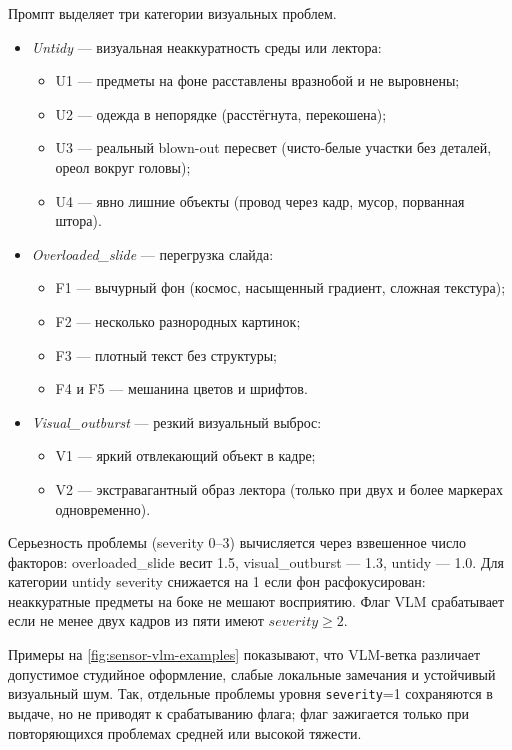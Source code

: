 Промпт выделяет три категории визуальных проблем.
\begin{itemize}
    \item \textit{Untidy} — визуальная неаккуратность среды или лектора:
    \begin{itemize}
        \item U1 — предметы на фоне расставлены вразнобой и не выровнены;
        \item U2 — одежда в непорядке (расстёгнута, перекошена);
        \item U3 — реальный blown-out пересвет (чисто-белые участки без деталей, ореол вокруг головы);
        \item U4 — явно лишние объекты (провод через кадр, мусор, порванная штора).
    \end{itemize}

    \item \textit{Overloaded\_slide} — перегрузка слайда:
    \begin{itemize}
        \item F1 — вычурный фон (космос, насыщенный градиент, сложная текстура);
        \item F2 — несколько разнородных картинок;
        \item F3 — плотный текст без структуры;
        \item F4 и F5 — мешанина цветов и шрифтов.
    \end{itemize}

    \item \textit{Visual\_outburst} — резкий визуальный выброс:
    \begin{itemize}
        \item V1 — яркий отвлекающий объект в кадре;
        \item V2 — экстравагантный образ лектора (только при двух и более маркерах одновременно).
    \end{itemize}
\end{itemize}

Серьезность проблемы (severity 0–3) вычисляется через взвешенное число факторов:
overloaded\_slide весит 1.5, visual\_outburst — 1.3, untidy — 1.0.
Для категории untidy severity снижается на 1 если фон расфокусирован:
неаккуратные предметы на боке не мешают восприятию.
Флаг VLM срабатывает если не менее двух кадров из пяти имеют $severity\geq 2$.

Примеры на \cref{fig:sensor-vlm-examples} показывают, что VLM-ветка различает допустимое студийное оформление,
слабые локальные замечания и устойчивый визуальный шум. Так, отдельные проблемы уровня \texttt{severity}=1 сохраняются в выдаче,
но не приводят к срабатыванию флага; флаг зажигается только при повторяющихся проблемах средней или высокой тяжести.

